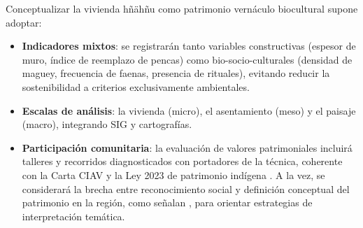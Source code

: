 Conceptualizar la vivienda hñähñu como patrimonio vernáculo biocultural
supone adoptar:

\begin{itemize}
	\item \textbf{Indicadores mixtos}: se registrarán tanto variables
	      constructivas (espesor de muro, índice de reemplazo de pencas)
	      como bio-socio-culturales (densidad de maguey, frecuencia de
	      faenas, presencia de rituales), evitando reducir la sostenibilidad
	      a criterios exclusivamente ambientales.\citep{larraga2014sust}
	\item \textbf{Escalas de análisis}: la vivienda (micro),
	      el asentamiento (meso) y el paisaje (macro), integrando SIG y
	      cartografías.
	\item \textbf{Participación comunitaria}: la evaluación de valores
	      patrimoniales incluirá talleres y recorridos diagnosticados con
	      portadores de la técnica, coherente con la Carta CIAV y la Ley
	      2023 de patrimonio indígena \citep{ley2023patrimonio}.  A la vez,
	      se considerará la brecha entre reconocimiento social y definición
	      conceptual del patrimonio en la región, como señalan
	      \citeauthor{rodriguezestudio}, para orientar estrategias de
	      interpretación temática.\citep{rodriguezestudio,gandara2000}
\end{itemize}
